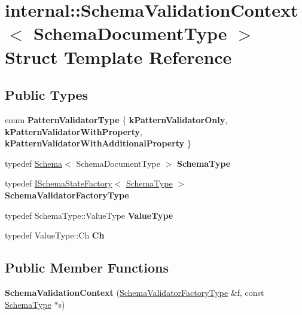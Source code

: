 \hypertarget{a02380}{}\section{internal\+:\+:Schema\+Validation\+Context$<$ Schema\+Document\+Type $>$ Struct Template Reference}
\label{a02380}
\subsection*{Public Types}
\begin{DoxyCompactItemize}
\item 
\mbox{\label{a02380_a4fb1b8fe7ecb9d4608e6b0ac0716826c}} 
enum {\bfseries Pattern\+Validator\+Type} \{ {\bfseries k\+Pattern\+Validator\+Only}, 
{\bfseries k\+Pattern\+Validator\+With\+Property}, 
{\bfseries k\+Pattern\+Validator\+With\+Additional\+Property}
 \}
\item 
\mbox{\label{a02380_a79b155ab3711b97b6e33ced450614397}} 
typedef \hyperlink{a02356}{Schema}$<$ Schema\+Document\+Type $>$ {\bfseries Schema\+Type}
\item 
\mbox{\label{a02380_a33fa91fd8e880d1adb9b891fe441f110}} 
typedef \hyperlink{a02364}{I\+Schema\+State\+Factory}$<$ \hyperlink{a02356}{Schema\+Type} $>$ {\bfseries Schema\+Validator\+Factory\+Type}
\item 
\mbox{\label{a02380_acc134e808d3a4dbe8834eb1a3e98e816}} 
typedef Schema\+Type\+::\+Value\+Type {\bfseries Value\+Type}
\item 
\mbox{\label{a02380_abd905cd1513b117f1db68b58d6c41daf}} 
typedef Value\+Type\+::\+Ch {\bfseries Ch}
\end{DoxyCompactItemize}
\subsection*{Public Member Functions}
\begin{DoxyCompactItemize}
\item 
\mbox{\label{a02380_a4adc8f66779626c9da4a56e7a87dcfac}} 
{\bfseries Schema\+Validation\+Context} (\hyperlink{a02364}{Schema\+Validator\+Factory\+Type} \&f, const \hyperlink{a02356}{Schema\+Type} $\ast$s)
\end{DoxyCompactItemize}
